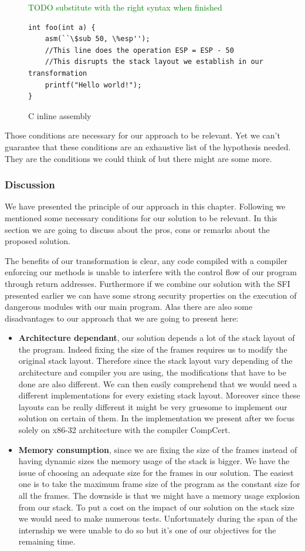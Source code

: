 \documentclass[11pt]{sdm}
\begin{document}
\begin{figure}
\textcolor{green}{TODO substitute with the right syntax when finished}
\begin{lstlisting}
int foo(int a) {
	asm(``\$sub 50, \%esp'');
	//This line does the operation ESP = ESP - 50
	//This disrupts the stack layout we establish in our transformation
	printf("Hello world!");
}
\end{lstlisting}
\centering
\caption{C inline assembly}
\label{inline_assembly}
\end{figure}


Those conditions are necessary for our approach to be relevant. Yet we can't guarantee that these conditions are an exhaustive list of the hypothesis needed. They are the conditions we could think of but there might are some more.

\subsubsection{Discussion}
\label{ssub:Discussion}
	We have presented the principle of our approach in this chapter. Following we mentioned some necessary conditions for our solution to be relevant. In this section we are going to discuss about the pros, cons or remarks about the proposed solution.

	The benefits of our transformation is clear, any code compiled with a compiler enforcing our methods is unable to interfere with the control flow of our program through return addresses.
	Furthermore if we combine our solution with the SFI presented earlier we can have some strong security properties on the execution of dangerous modules with our main program.
Alas there are also some disadvantages to our approach that we are going to present here:
	\begin{itemize}
		\item \textbf{Architecture dependant}, our solution depends a lot of the stack layout of the program. Indeed fixing the size of the frames requires us to modify the original stack layout. Therefore since the stack layout vary depending of the architecture and compiler you are using, the modifications that have to be done are also different. We can then easily comprehend that we would need a different implementations for every existing stack layout. Moreover since these layouts can be really different it might be very gruesome to implement our solution on certain of them.
In the implementation we present after we focus solely on x86-32 architecture with the compiler CompCert.
		\item \textbf{Memory consumption}, since we are fixing the size of the frames instead of having dynamic sizes the memory usage of the stack is bigger. We have the issue of choosing an adequate size for the frames in our solution. The easiest one is to take the maximum frame size of the program as the constant size for all the frames. The downside is that we might have a memory usage explosion from our stack. To put a cost on the impact of our solution on the stack size we would need to make numerous tests. Unfortunately during the span of the internship we were unable to do so but it's one of our objectives for the remaining time.
	\end{itemize}
\end{document}
